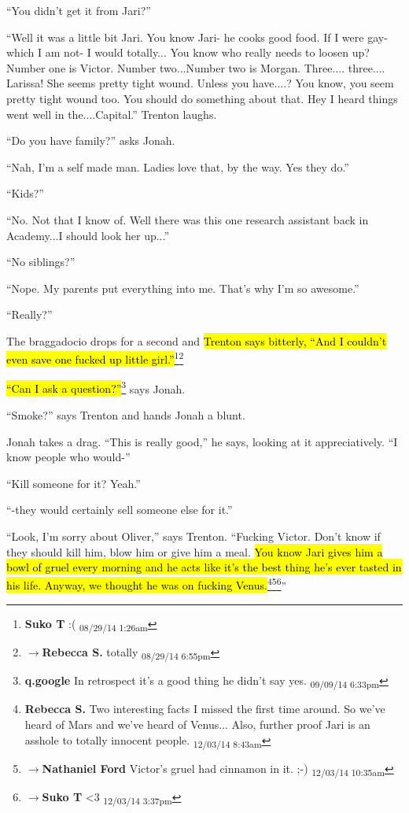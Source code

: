 ``You didn't get it from Jari?''

``Well it was a little bit Jari.  You know Jari- he cooks good food.  If I were gay- which I am not- I would totally... You know who really needs to loosen up?  Number one is Victor.  Number two...Number two is Morgan.  Three.... three.... Larissa!  She seems pretty tight wound.  Unless you have....?  You know, you seem pretty tight wound too.  You should do something about that.  Hey I heard things went well in the....Capital.''  Trenton laughs.

``Do you have family?'' asks Jonah.

``Nah, I'm a self made man.  Ladies love that, by the way.  Yes they do.''

``Kids?''

``No.  Not that I know of.  Well there was this one research assistant back in Academy...I should look her up...''

``No siblings?''  

``Nope.  My parents put everything into me. That's why I'm so awesome.''

``Really?''

The braggadocio drops for a second and \hl{Trenton says bitterly, ``And I couldn't even save one fucked up little girl.''}\footnote{\textbf{Suko T }:( \textsubscript{08/29/14 1:26am}}\footnote{$\rightarrow$\textbf{Rebecca S. }totally \textsubscript{08/29/14 6:55pm}}

\hl{``Can I ask a question?''}\footnote{\textbf{q.google }In retrospect it's a good thing he didn't say yes. \textsubscript{09/09/14 6:33pm}} says Jonah.

``Smoke?'' says Trenton and hands Jonah a blunt.

Jonah takes a drag.  ``This is really good,'' he says, looking at it appreciatively.  ``I know people who would-''

``Kill someone for it?  Yeah.''

``-they would certainly sell someone else for it.''

``Look, I'm sorry about Oliver,'' says Trenton.  ``Fucking Victor.  Don't know if they should kill him, blow him or give him a meal.   \hl{You know Jari gives him a bowl of gruel every morning and he acts like it's the best thing he's ever tasted in his life.  Anyway, we thought he was on fucking Venus.}\footnote{\textbf{Rebecca S. }Two interesting facts I missed the first time around.  So we've heard of Mars and we've heard of Venus...
Also, further proof Jari is an asshole to totally innocent people. \textsubscript{12/03/14 8:43am}}\footnote{$\rightarrow$\textbf{Nathaniel Ford }Victor's gruel had cinnamon in it. ;-) \textsubscript{12/03/14 10:35am}}\footnote{$\rightarrow$\textbf{Suko T }\textless 3 \textsubscript{12/03/14 3:37pm}}''

